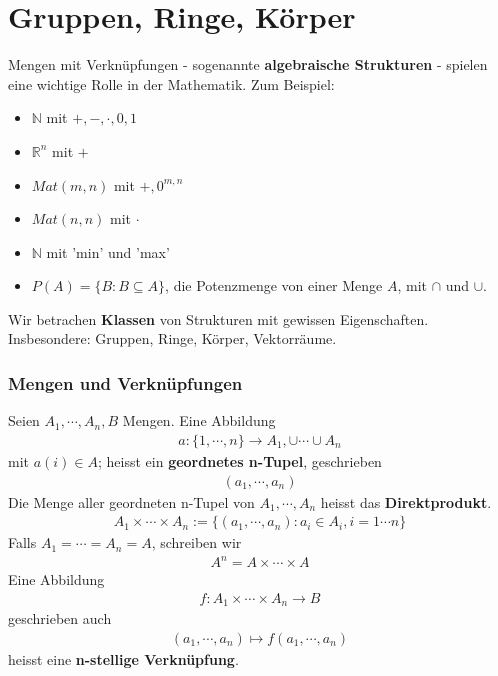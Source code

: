 \documentclass[11pt]{report}
\newcommand*\Zb[1] {\mathbb{#1}}
\newcommand*\f[1] {\textbf{#1}}
\begin{document}
\chapter{Gruppen, Ringe, Körper}
Mengen mit Verknüpfungen - sogenannte \f{algebraische Strukturen} - spielen eine wichtige Rolle in der Mathematik.
Zum Beispiel:
\begin{itemize}
 \item $\Zb{N}$ mit $+, -, \cdot, 0, 1$
 \item $\Zb{R}^n$ mit $+$
 \item $Mat(m, n)$ mit $+, 0^{m, n}$
 \item $Mat(n, n)$ mit $\cdot$
 \item $\Zb{N}$ mit 'min' und 'max'
 \item $P(A) = \{B: B \subseteq A\}$, die Potenzmenge von einer Menge $A$, mit $\cap$ und $\cup$.
\end{itemize}
Wir betrachen \f{Klassen} von Strukturen mit gewissen Eigenschaften. Insbesondere: Gruppen, Ringe, Körper, Vektorräume.
\subsection{Mengen und Verknüpfungen}
Seien $A_1, \cdots, A_n, B$ Mengen. Eine Abbildung 
\begin{align}
 a:\{1, \cdots, n\} \rightarrow A_1, \cup \cdots \cup A_n
\end{align}
mit $a(i) \in A$;
heisst ein \f{geordnetes n-Tupel}, geschrieben
\begin{align}
 (a_1, \cdots, a_n)
\end{align}
Die Menge aller geordneten n-Tupel von $A_1, \cdots, A_n$ heisst das \f{Direktprodukt}.
\begin{align}
A_1\times \cdots \times A_n := \{(a_1, \cdots, a_n): a_i \in A_i, i=1 \cdots n\}
\end{align}
Falls $A_1 = \cdots = A_n = A$, schreiben wir 
\begin{align}
 A^n = A \times \cdots \times A
\end{align}
Eine Abbildung 
\begin{align}
 f: A_1 \times \cdots \times A_n \rightarrow B
\end{align}
geschrieben auch
\begin{align}
 (a_1, \cdots, a_n) \mapsto f(a_1, \cdots, a_n)
\end{align}
heisst eine \f{n-stellige Verknüpfung}.
\end{document}
